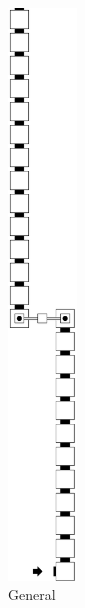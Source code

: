 \begin{itemize}
        \begin{figure}[H]
            \centering
            \begin{subfigure}[t]{0.2\textwidth}
                \centering
                \includegraphics[width=0.2\textwidth]{warping_warp_bridge_general}
                \caption{\label{fig:warp_bridge_general} General}
            \end{subfigure}%
            ~
            \begin{subfigure}[t]{0.2\textwidth}
                \centering

\end{subfigure}
\end{figure}
\end{itemize}
